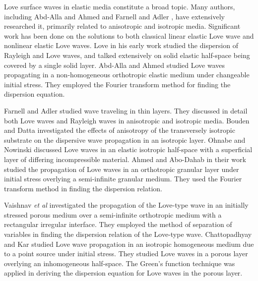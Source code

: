 \documentclass[11pt,letter,subeqn,fleqn]{article}
\numberwithin{equation}{section}
\numberwithin{table}{section}
\numberwithin{figure}{section}
\begin{document}
\medskip

Love surface waves in elastic media constitute a broad topic. Many authors, including Abd-Alla and Ahmed \cite{abd1999propagation} and Farnell and Adler \cite{farnell2012elastic}, have extensively researched it, primarily related to anisotropic and isotropic media. Significant work has been done on the solutions to both classical linear elastic Love wave and nonlinear elastic Love waves. Love \cite{love2015some} in his early work studied the dispersion of Rayleigh and Love waves, and talked extensively on solid elastic half-space being covered by a single solid layer. Abd-Alla and Ahmed \cite{abd1999propagation} studied Love waves propagating in a non-homogeneous orthotropic elastic medium under changeable initial stress. They employed the Fourier transform method for finding the dispersion equation.

Farnell and Adler \cite{farnell2012elastic} studied wave traveling in thin layers. They discussed in detail both Love waves and Rayleigh waves in anisotropic and isotropic media. Bouden and Datta \cite{bouden1990rayleigh} investigated the effects of anisotropy of the transversely isotropic substrate on the dispersive wave propagation in an isotropic layer. Ohnabe and Nowinski \cite{ohnabe1979propagation} discussed Love waves in an elastic isotropic half-space with a superficial layer of differing incompressible material. Ahmed and Abo-Dahab \cite{ahmed2010propagation} in their work studied the propagation of Love waves in an orthotropic granular layer under initial stress overlying a semi-infinite granular medium. They used the Fourier transform method in finding the dispersion relation.


Vaishnav \textit{et al} \cite{vaishnav2016propagation} investigated the propagation of the Love-type wave in an initially stressed porous medium over a semi-infinite orthotropic medium with a rectangular irregular interface. They employed the method of separation of variables in finding the dispersion relation of the Love-type wave. Chattopadhyay and Kar \cite{chattopadhyay1981love} studied Love wave propagation in an isotropic homogeneous medium due to a point source under initial stress. They studied Love waves in a porous layer overlying an inhomogeneous half-space. The Green's function technique was applied in deriving the dispersion equation for Love waves in the porous layer.
\end{document}
